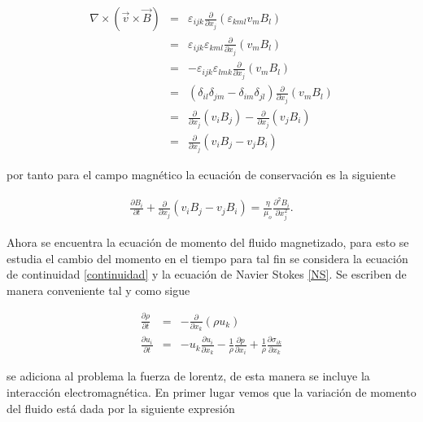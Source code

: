 \begin{eqnarray}
\nabla\times(\vec{v}\times\vec{B}) &=& \varepsilon_{ijk}\frac{\partial}{\partial x_{j}}(\varepsilon_{kml}v_{m}B_{l})\\
&=&\varepsilon_{ijk}\varepsilon_{kml}\frac{\partial}{\partial x_{j}}(v_{m}B_{l})\\
&=&-\varepsilon_{ijk}\varepsilon_{lmk}\frac{\partial}{\partial x_{j}}(v_{m}B_{l})\\
&=&(\delta_{il}\delta_{jm}-\delta_{im}\delta_{jl})\frac{\partial}{\partial x_{j}}(v_{m}B_{l})\\
&=&\frac{\partial}{\partial x_{j}}(v_{i}B_{j})-\frac{\partial}{\partial x_{j}}(v_{j}B_{i})\\
&=&\frac{\partial}{\partial x_{j}}(v_{i}B_{j}-v_{j}B_{i})
\end{eqnarray}

\noindent por tanto para el campo magnético  la ecuación de conservación es la siguiente 

\begin{eqnarray}
\boxed{
\frac{\partial B_{i}}{\partial t} + \frac{\partial}{\partial x_{j}}(v_{i}B_{j}-v_{j}B_{i}) = \frac{\eta}{\mu_{o}}\frac{\partial^{2}B_{i}}{\partial x_{j}^{2}}
}.
\end{eqnarray}



\noindent Ahora se encuentra la ecuación de momento del fluido magnetizado, para esto se estudia el cambio del momento en el tiempo para tal fin se considera la ecuación de continuidad \eqref{continuidad} y la ecuación de Navier Stokes \eqref{NS}. Se escriben de manera conveniente tal y como sigue 

\begin{eqnarray}
\label{contindicial}
\frac{\partial \rho}{\partial t}&=&-\frac{\partial}{\partial x_{k}}(\rho u_{k})\\
\label{NSindicial}
\frac{\partial u_{i}}{\partial t} &=& -u_{k}\frac{\partial u_{i}}{\partial x_{k}} - \frac{1}{\rho}\frac{\partial p}{\partial x_{i}} + \frac{1}{\rho}\frac{\partial \sigma_{ik}}{\partial x_{k}}
\end{eqnarray}



\noindent se adiciona al problema la fuerza de lorentz, de esta manera se incluye la interacción electromagnética. En primer lugar vemos que la variación de momento del fluido está dada por la siguiente expresión 

